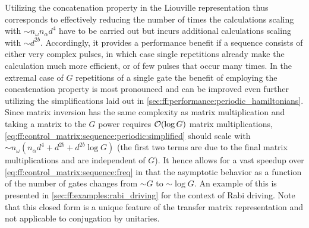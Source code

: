 Utilizing the concatenation property in the Liouville representation thus corresponds to effectively reducing the number of times the calculations scaling with $\sim n_\omega n_\alpha d^4$ have to be carried out but incurs additional calculations scaling with $\sim d^{2b}$.
Accordingly, it provides a performance benefit if a sequence consists of either very complex pulses, in which case single repetitions already make the calculation much more efficient, or of few pulses that occur many times.
In the extremal case of $G$ repetitions of a single gate the benefit of employing the concatenation property is most pronounced and can be improved even further utilizing the simplifications laid out in \cref{sec:ff:performance:periodic_hamiltonians}.
Since matrix inversion has the same complexity as matrix multiplication and taking a matrix to the $G$ power requires $\order{\log G}$ matrix multiplications, \cref{eq:ff:control_matrix:sequence:periodic:simplified} should scale with $\sim n_\omega (n_\alpha d^4 + d^{2b} + d^{2b}\log{G})$ (the first two terms are due to the final matrix multiplications and are independent of $G$).
It hence allows for a vast speedup over \cref{eq:ff:control_matrix:sequence:freq} in that the asymptotic behavior as a function of the number of gates changes from $\sim G$ to $\sim\log G$.
An example of this is presented in \cref{sec:ff:examples:rabi_driving} for the context of Rabi driving.
Note that this closed form is a unique feature of the transfer matrix representation and not applicable to conjugation by unitaries.

